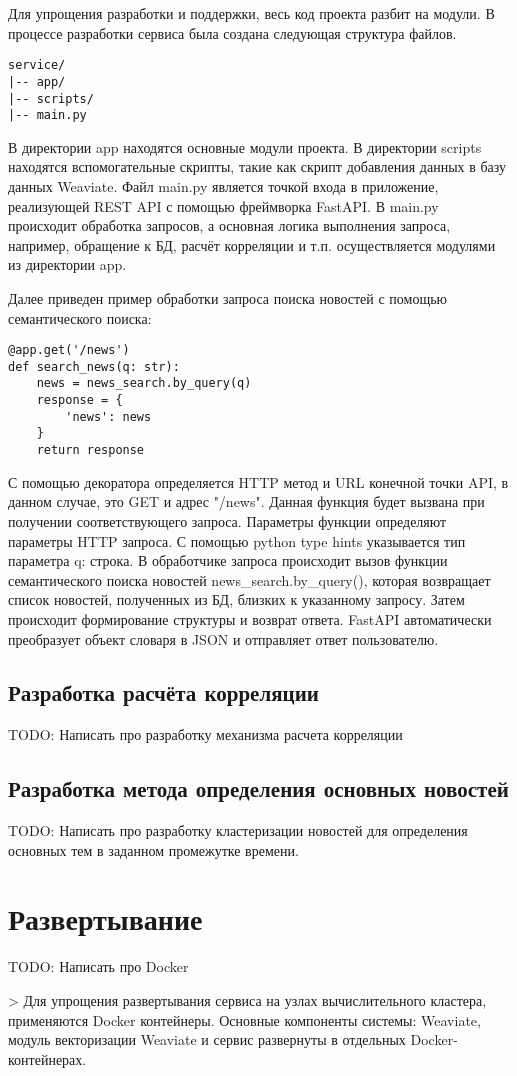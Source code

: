 Для упрощения разработки и поддержки, весь код проекта разбит на модули. В процессе разработки сервиса была создана следующая структура файлов.
\begin{lstlisting}
service/
|-- app/
|-- scripts/
|-- main.py
\end{lstlisting}

В директории app находятся основные модули проекта. В директории scripts находятся вспомогательные скрипты, такие как скрипт добавления данных в базу данных Weaviate. Файл main.py является точкой входа в приложение, реализующей REST API с помощью фреймворка FastAPI. В main.py происходит обработка запросов, а основная логика выполнения запроса, например, обращение к БД, расчёт корреляции и т.п. осуществляется модулями из директории app.

Далее приведен пример обработки запроса поиска новостей с помощью семантического поиска:
\begin{lstlisting}
@app.get('/news')
def search_news(q: str):
    news = news_search.by_query(q)
    response = {
        'news': news
    }
    return response
\end{lstlisting}

С помощью декоратора определяется HTTP метод и URL конечной точки API, в данном случае, это GET и адрес "/news". Данная функция будет вызвана при получении соответствующего запроса. Параметры функции определяют параметры HTTP запроса. С помощью python type hints указывается тип параметра q: строка. В обработчике запроса происходит вызов функции семантического поиска новостей news\_search.by\_query(), которая возвращает список новостей, полученных из БД, близких к указанному запросу. Затем происходит формирование структуры и возврат ответа. FastAPI автоматически преобразует объект словаря в JSON и отправляет ответ пользователю.

\subsection{Разработка расчёта корреляции}

TODO: Написать про разработку механизма расчета корреляции

\subsection{Разработка метода определения основных новостей}

TODO: Написать про разработку кластеризации новостей для определения основных тем в заданном промежутке времени.


\section{Развертывание}

TODO: Написать про Docker


> Для упрощения развертывания сервиса на узлах вычислительного кластера, применяются Docker контейнеры. Основные компоненты системы: Weaviate, модуль векторизации Weaviate и сервис развернуты в отдельных Docker-контейнерах.
